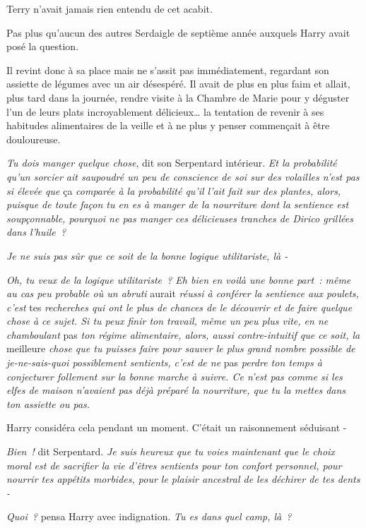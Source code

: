 \later

Terry n'avait jamais rien entendu de cet acabit.

Pas plus qu'aucun des autres Serdaigle de septième année auxquels Harry avait posé la question.

Il revint donc à sa place mais ne s'assit pas immédiatement, regardant son assiette de légumes avec un air désespéré. Il avait de plus en plus faim et allait, plus tard dans la journée, rendre visite à la Chambre de Marie pour y déguster l'un de leurs plats incroyablement délicieux… la tentation de revenir à ses habitudes alimentaires de la veille et à ne plus y penser commençait à être douloureuse.

\emph{Tu dois manger quelque chose}, dit son Serpentard intérieur. \emph{Et la probabilité qu'un sorcier ait saupoudré un peu de conscience de soi sur des volailles n'est pas si élevée que} ça \emph{comparée à la probabilité qu'il l'ait fait sur des plantes, alors, puisque de toute façon tu en es à manger de la nourriture dont la sentience est soupçonnable, pourquoi ne pas manger ces délicieuses tranches de Dirico grillées dans l'huile~?}

\emph{Je ne suis pas sûr que ce soit de la bonne logique utilitariste, là -}

\emph{Oh, tu veux de la logique utilitariste~? Eh bien en voilà une bonne part~: même au cas peu probable où un abruti} aurait \emph{réussi à conférer la sentience aux poulets, c'est} tes \emph{recherches qui ont le plus de chances de le découvrir et de faire quelque chose à ce sujet. Si tu peux finir ton travail, même un peu plus vite, en ne chamboulant} pas \emph{ton régime alimentaire, alors, aussi contre-intuitif que ce soit, la} meilleure \emph{chose que tu puisses faire pour sauver le plus grand nombre possible de je-ne-sais-quoi possiblement sentients, c'est de ne} pas \emph{perdre ton temps à conjecturer follement sur la bonne marche à suivre. Ce n'est pas comme si les elfes de maison n'avaient pas déjà préparé la nourriture, que tu la mettes dans ton assiette ou pas.}

Harry considéra cela pendant un moment. C'était un raisonnement séduisant -

\emph{Bien~!} dit Serpentard. \emph{Je suis heureux que tu voies maintenant que le choix moral est de sacrifier la vie d'êtres sentients pour ton confort personnel, pour nourrir tes appétits morbides, pour le plaisir ancestral de les déchirer de tes dents -}

\emph{Quoi~?} pensa Harry avec indignation. \emph{Tu es dans quel camp, là~?}

